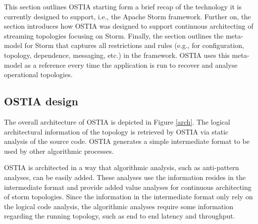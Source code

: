 

This section outlines OSTIA starting form a brief recap of the technology it is currently designed to support, i.e., the Apache Storm framework. Further on, the section introduces how OSTIA was designed to support continuous architecting of streaming topologies focusing on Storm. Finally, the section outlines the meta-model for Storm that captures all restrictions and rules (e.g., for configuration, topology, dependence, messaging, etc.) in the framework. OSTIA uses this meta-model as a reference every time the application is run to recover and analyse operational topologies.

\subsection{OSTIA design}

The overall architecture of OSTIA is depicted in
Figure \ref{arch}. The logical architectural information of the
topology is retrieved by OSTIA via static analysis of the source code. OSTIA
generates a simple intermediate format to be used by other algorithmic
processes.

OSTIA is architected in a way that algorithmic analysis, such as anti-pattern
analyses, can be easily added. These analyses use the information resides in the
intermediate format and provide added value analyses for continuous architecting
of storm topologies. Since the information in the intermediate format only rely
on the logical code analysis, the algorithmic analyses require some
information regarding the running topology, such as end to end latency and
throughput.


